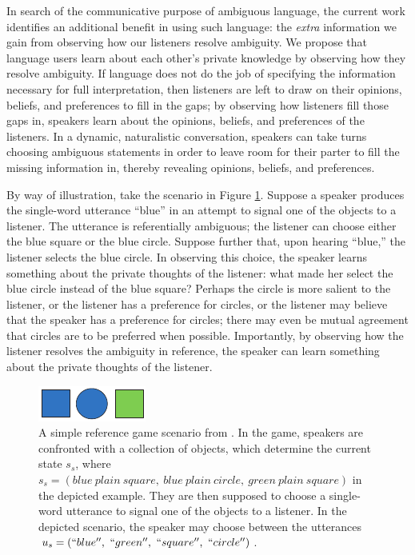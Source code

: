 \documentclass[10pt,a4paper]{article}
\begin{document}
In search of the communicative purpose of ambiguous language, the current work identifies an additional benefit in using such language: the \emph{extra} information we gain from observing how our listeners resolve ambiguity.
We propose that language users learn about each other's private knowledge by observing how they resolve ambiguity. If language does not do the job of specifying the information necessary for full interpretation, then listeners are left to draw on their opinions, beliefs, and preferences to fill in the gaps; by observing how listeners fill those gaps in, speakers learn about the opinions, beliefs, and preferences of the listeners.
In a dynamic, naturalistic conversation, speakers can take turns choosing ambiguous statements in order to leave room for their parter to fill the missing information in, thereby revealing opinions, beliefs, and preferences. 


By way of illustration, take the scenario in Figure \ref{FG-ref-game}.
Suppose a speaker produces the single-word utterance ``blue'' in an attempt to signal one of the objects to a listener. The utterance is referentially ambiguous; the listener can choose either the blue square or the blue circle. Suppose further that, upon hearing ``blue,'' the listener selects the blue circle. In observing this choice, the speaker learns something about the private thoughts of the listener: what made her select the blue circle instead of the blue square? Perhaps the circle is more salient to the listener, or the listener has a preference for circles, or the listener may believe that the speaker has a preference for circles; there may even be mutual agreement that circles are to be preferred when possible. Importantly, by observing how the listener resolves the ambiguity in reference, the speaker can learn something about the private thoughts of the listener. 

\begin{figure}
	\centering
	\includegraphics[width=.5\linewidth]{images/rsascene-eps-converted-to.pdf}
	\caption{A simple reference game scenario from \protect{}.
		In the game, speakers are confronted with a collection of objects, which determine the current state $s_s$, where $s_s=(blue\ plain\ square,\ blue\ plain\ circle,\ green\ plain\ square)$ in the depicted example. 
		They are then supposed to choose a single-word utterance to signal one of the objects to a listener.
		In the depicted scenario, the speaker may choose between the utterances $u_s=(``blue'',\ ``green'',\ ``square'',\ ``circle'')$.}
	\label{FG-ref-game}
\end{figure}
\end{document}
